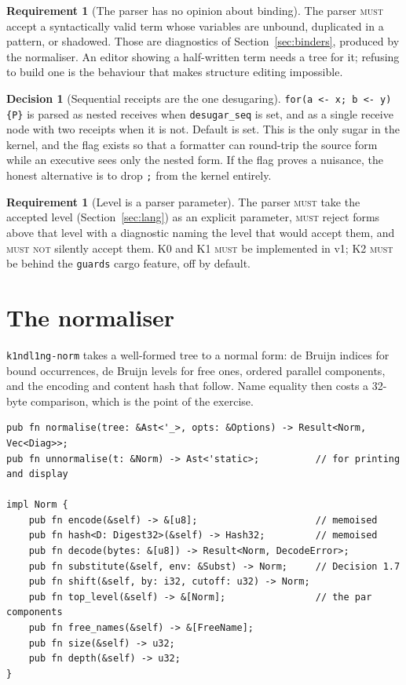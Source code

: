 \documentclass[11pt,a4paper]{article}
\newcommand{\code}[1]{\texttt{#1}}
\newcommand{\MUST}{\textsc{must}}
\newcommand{\MUSTNOT}{\textsc{must not}}
\theoremstyle{definition}
\newtheorem{requirement}[definition]{Requirement}
\newtheorem{decision}[definition]{Decision}
\theoremstyle{plain}
\begin{document}
\begin{requirement}[The parser has no opinion about binding]\label{req:noopinion}
The parser \MUST{} accept a syntactically valid term whose variables are
unbound, duplicated in a pattern, or shadowed. Those are diagnostics of
Section~\ref{sec:binders}, produced by the normaliser. An editor showing a
half-written term needs a tree for it; refusing to build one is the behaviour
that makes structure editing impossible.
\end{requirement}

\begin{decision}[Sequential receipts are the one desugaring]
\code{for(a <- x; b <- y)\{P\}} is parsed as nested receives when
\code{desugar\_seq} is set, and as a single receive node with two receipts when
it is not. Default is set. This is the only sugar in the kernel, and the flag
exists so that a formatter can round-trip the source form while an executive
sees only the nested form. If the flag proves a nuisance, the honest
alternative is to drop \code{;} from the kernel entirely.
\end{decision}

\begin{requirement}[Level is a parser parameter]\label{req:level2}
The parser \MUST{} take the accepted level (Section~\ref{sec:lang}) as an
explicit parameter, \MUST{} reject forms above that level with a diagnostic
naming the level that would accept them, and \MUSTNOT{} silently accept them.
K0 and K1 \MUST{} be implemented in v1; K2 \MUST{} be behind the \code{guards}
cargo feature, off by default.
\end{requirement}

\section{The normaliser}\label{sec:norm}

\code{k1ndl1ng-norm} takes a well-formed tree to a normal form: de Bruijn
indices for bound occurrences, de Bruijn levels for free ones, ordered parallel
components, and the encoding and content hash that follow. Name equality then
costs a 32-byte comparison, which is the point of the exercise.

\begin{lstlisting}
pub fn normalise(tree: &Ast<'_>, opts: &Options) -> Result<Norm, Vec<Diag>>;
pub fn unnormalise(t: &Norm) -> Ast<'static>;          // for printing and display

impl Norm {
    pub fn encode(&self) -> &[u8];                     // memoised
    pub fn hash<D: Digest32>(&self) -> Hash32;         // memoised
    pub fn decode(bytes: &[u8]) -> Result<Norm, DecodeError>;
    pub fn substitute(&self, env: &Subst) -> Norm;     // Decision 1.7
    pub fn shift(&self, by: i32, cutoff: u32) -> Norm;
    pub fn top_level(&self) -> &[Norm];                // the par components
    pub fn free_names(&self) -> &[FreeName];
    pub fn size(&self) -> u32;
    pub fn depth(&self) -> u32;
}
\end{lstlisting}
\end{document}
